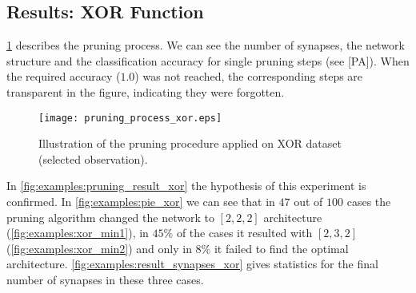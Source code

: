 \begin{table}[H]
\centering
{}
\caption{Experiment settings for the XOR example.}
\label{tab:examples:xor_settings}
\end{table}

\subsection*{Results: XOR Function}
\cref{fig:examples:pruning_process_xor} describes the pruning process. We can see the number of synapses, the network structure and the classification accuracy for single pruning steps (see [PA]). When the required accuracy ($ 1.0 $) was not reached, the corresponding steps are transparent in the figure, indicating they were forgotten.

\begin{figure}[H]
\centering
\texttt{[image: pruning\_process\_xor.eps]}
\caption{Illustration of the pruning procedure applied on XOR dataset (selected observation).}
\label{fig:examples:pruning_process_xor}
\end{figure}

In \cref{fig:examples:pruning_result_xor} the hypothesis of this experiment is confirmed. In \cref{fig:examples:pie_xor} we can see that in $ 47 $ out of $ 100 $ cases the pruning algorithm changed the network to $ [2, 2, 2] $ architecture (\cref{fig:examples:xor_min1}), in $ 45\% $ of the cases it resulted with $ [2, 3, 2] $ (\cref{fig:examples:xor_min2}) and only in $ 8\% $ it failed to find the optimal architecture. \cref{fig:examples:result_synapses_xor} gives statistics for the final number of synapses in these three cases.

